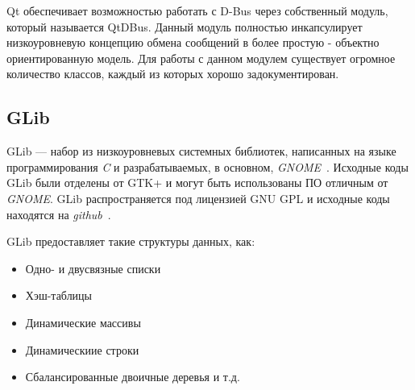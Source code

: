 Qt обеспечивает возможностью работать с D-Bus через собственный модуль, который называется QtDBus. Данный модуль полностью инкапсулирует низкоуровневую концепцию обмена сообщений в более простую - объектно ориентированную модель. Для работы с данном модулем существует огромное количество классов, каждый из которых хорошо задокументирован.

\subsection{GLib}
GLib --- набор из низкоуровневых системных библиотек, написанных на языке программирования \textit{C} и разрабатываемых, в основном, \textit{GNOME}~\cite{gnome}. Исходные коды GLib были отделены от GTK+ и могут быть использованы ПО отличным от \textit{GNOME}. GLib распространяется под лицензией GNU GPL и исходные коды находятся на \textit{github}~\cite{glibSources}.

GLib предоставляет такие структуры данных, как:
\begin{itemize}
\item Одно- и двусвязные списки
\item Хэш-таблицы
\item Динамические массивы
\item Динамическиие строки
\item Сбалансированные двоичные деревья и т.д.
\end{itemize}



